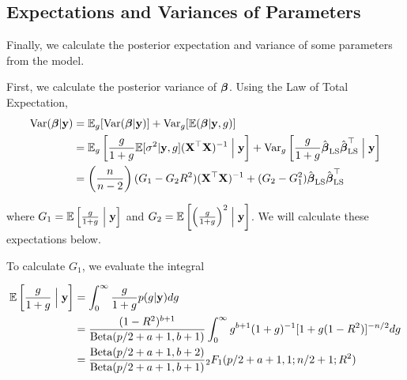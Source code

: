 \documentclass{amsart}[12pt]
\newcommand{\mgc}[1]{{\color{blue}#1}}
\begin{document}




\subsection{Expectations and Variances of Parameters}
Finally, we calculate the posterior expectation and variance of some parameters from the model.

First, we calculate the posterior variance of ${\boldsymbol \beta}$. Using the Law of Total Expectation,
\begin{align*}
	\text{Var}({\boldsymbol \beta} | {\bf y}) & = \mathbb{E}_g[\text{Var}({\boldsymbol \beta} | {\bf y})] + \text{Var}_g[\mathbb{E}({\boldsymbol \beta}|{\bf y}, g)]                                                                                                                                                 \\
	                   & = \mathbb{E}_g\left[\frac{g}{1 + g} \mathbb{E}[\sigma^2|{\bf y}, g] ({\bf X}^\top {\bf X})^{-1} \Bigm| {\bf y} \right] + \text{Var}_g\left[\frac{g}{1 + g} \hat{{\boldsymbol \beta}}_{\text{LS}} \hat{{\boldsymbol \beta}}_{\text{LS}}^\top \Bigm| {\bf y} \right]                                   \\
	                   & = \left( \frac{n}{n - 2} \right) (G_1 - G_2 R^2) ({\bf X}^\top {\bf X})^{-1} + (G_2 - G_1^2) \hat{{\boldsymbol \beta}}_{\text{LS}} \hat{{\boldsymbol \beta}}_{\text{LS}}^\top                                                                                      
\end{align*}

where $G_1 = \mathbb{E}\left[\frac{g}{1 + g} \Bigm| {\bf y} \right]$ and $G_2 = \mathbb{E}\left[ \left(\frac{g}{1 + g} \right)^2 \Bigm| {\bf y} \right]$. We will calculate these expectations below.

To calculate $G_1$, we evaluate the integral

\begin{align*}
	\mathbb{E}\left[\frac{g}{1 + g} \Bigm| {\bf y} \right] & = \int_0^\infty \frac{g}{1 + g} p(g | {\bf y}) dg                                                                      \\
	                                           & = \frac{(1 - R^2)^{b+1}}{\text{Beta}(p/2 + a + 1, b + 1)} \int_0^\infty g^{b+1} (1 + g)^{-1} [1 + g (1 - R^2)]^{-n/2} dg \\
	                                           & = \frac{\text{Beta}(p/2 + a + 1, b + 2)}{\text{Beta}(p /2 + a + 1, b + 1)} {}_2 F_1(p/2 + a + 1, 1; n/2 + 1; R^2)              
\end{align*}
\end{document}
